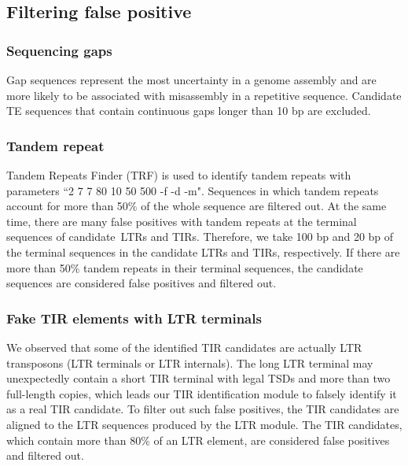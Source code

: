 \documentclass{bmcart}
\begin{document}

\subsection*{Filtering false positive}
\subsubsection*{Sequencing gaps}
Gap sequences represent the most uncertainty in a genome assembly and are more likely to be associated with misassembly in a repetitive sequence\cite{ou2019benchmarking}. Candidate TE sequences that contain continuous gaps longer than 10 bp are excluded.

\subsubsection*{Tandem repeat}
Tandem Repeats Finder (TRF)\cite{benson1999tandem} is used to identify tandem repeats with parameters ``2 7 7 80 10 50 500 -f -d -m". Sequences in which tandem repeats account for more than 50\% of the whole sequence are filtered out. At the same time, there are many false positives with tandem repeats at the terminal sequences of candidate LTRs and TIRs. Therefore, we take 100 bp and 20 bp of the terminal sequences in the candidate LTRs and TIRs, respectively. If there are more than 50\% tandem repeats in their terminal sequences, the candidate sequences are considered false positives and filtered out.

\subsubsection*{Fake TIR elements with LTR terminals}
We observed that some of the identified TIR candidates are actually LTR transposons (LTR terminals or LTR internals). The long LTR terminal may unexpectedly contain a short TIR terminal with legal TSDs and more than two full-length copies, which leads our TIR identification module to falsely identify it as a real TIR candidate. To filter out such false positives, the TIR candidates are aligned to the LTR sequences produced by the LTR module. The TIR candidates, which contain more than 80\% of an LTR element, are considered false positives and filtered out.
\end{document}
